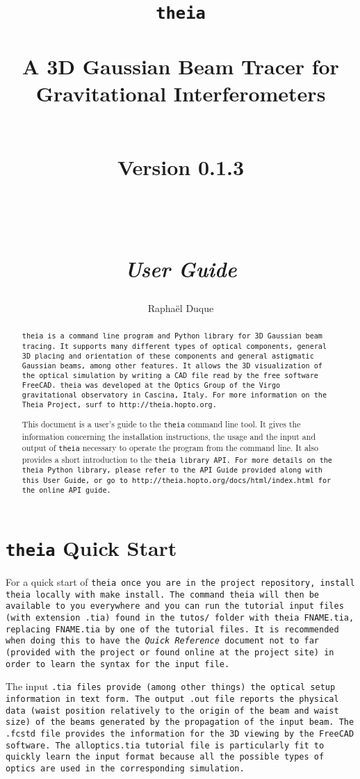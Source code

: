 \documentclass{article}
\title{\texttt{theia} \\ \quad \\A 3D Gaussian Beam Tracer for Gravitational Interferometers\\ \quad \\ \begin{small} Version 0.1.3 \end{small} \\ \quad \\ \textit{User Guide}}
\author{Rapha\"el Duque}
\begin{document}
\maketitle

\begin{abstract}
\tt{theia} is a command line program and Python library for 3D Gaussian beam tracing. It supports many different types of optical components, general 3D placing and orientation of these components and general astigmatic Gaussian beams, among other features. It allows the 3D visualization of the optical simulation by writing a CAD file read by the free software \tt{FreeCAD}. \tt{theia} was developed at the Optics Group of the Virgo gravitational observatory in Cascina, Italy. For more information on the Theia Project, surf to \tt{http://theia.hopto.org}.

This document is a user's guide to the \texttt{theia} command line tool. It gives the information concerning the installation instructions, the usage and the input and output of \texttt{theia} necessary to operate the program from the command line. It also provides a short introduction to the \tt{theia} library API. For more details on the \texttt{theia} Python library, please refer to the API Guide provided along with this User Guide, or go to \tt{http://theia.hopto.org/docs/html/index.html} for the online API guide.
\end{abstract}


\tableofcontents
\newpage


\section{\texttt{theia} Quick Start}
For a quick start of \tt{theia} once you are in the project repository, install \tt{theia} locally with \texttt{make install}. The command \tt{theia} will then be available to you everywhere and you can run the tutorial input files (with extension \texttt{.tia}) found in the \tt{tutos/} folder with \texttt{theia FNAME.tia}, replacing \texttt{FNAME.tia} by one of the tutorial files. It is recommended when doing this to have the \textit{Quick Reference} document not to far (provided with the project or found online at the project site) in order to learn the syntax for the input file.

The input \tt{.tia} files provide (among other things) the optical setup information in text form. The output \tt{.out} file reports the physical data (waist position relatively to the origin of the beam and waist size) of the beams generated by the propagation of the input beam. The \tt{.fcstd} file provides the information for the 3D viewing by the \tt{FreeCAD} software. The \tt{alloptics.tia} tutorial file is particularly fit to quickly learn the input format because all the possible types of optics are used in the corresponding simulation.
\end{document}

